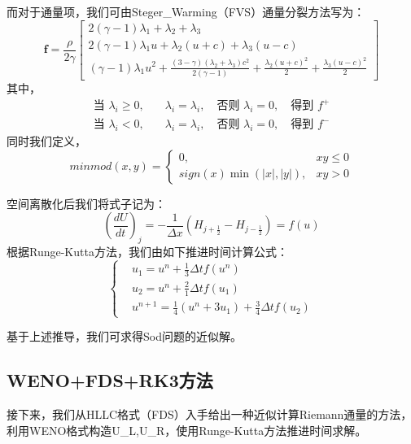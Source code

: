 \documentclass[12pt,a4paper]{article}%
\begin{document}
		而对于通量项，我们可由Steger\_Warming（FVS）通量分裂方法写为：
		\[
		\mathbf{f} = \frac{\rho}{2\gamma}
		\begin{bmatrix}
			2(\gamma - 1)\lambda_1 + \lambda_2 + \lambda_3 \\
			2(\gamma - 1)\lambda_1 u + \lambda_2 (u + c) + \lambda_3 (u - c) \\
			(\gamma - 1)\lambda_1 u^2 + \frac{(3 - \gamma)(\lambda_2 + \lambda_3)c^2}{2(\gamma - 1)} + \frac{\lambda_2 (u + c)^2}{2} + \frac{\lambda_3 (u - c)^2}{2}
		\end{bmatrix}
		\]
		其中，
		\[
		\begin{aligned}
			\text{当 } \lambda_i \geq 0,\quad & \lambda_i = \lambda_i,\quad \text{否则 } \lambda_i = 0,\quad \text{得到 } f^+ \\
			\text{当 } \lambda_i < 0,\quad & \lambda_i = \lambda_i,\quad \text{否则 } \lambda_i = 0,\quad \text{得到 } f^-
		\end{aligned}
		\]
		同时我们定义，
		\[
			minmod(x,y) = 
			\begin{cases}
				0, & xy \leq 0 \\
				sign(x)\min(|x|,|y|), & xy>0
			\end{cases}
		\]
		
		空间离散化后我们将式子记为：
		\[
			(\frac{dU}{dt})_j = -\frac{1}{\Delta x}(H_{j+\frac12} - H_{j-\frac12}) = f(u)
		\]
		根据Runge-Kutta方法，我们由如下推进时间计算公式：
		\[
		\left\{
			\begin{aligned}
				& u_1 = u^n + \frac13 \Delta t f(u^n) \\
				& u_2 = u^n + \frac21 \Delta t f(u_1) \\
				& u^{n+1} = \frac14 (u^n+3u_1) + \frac34 \Delta t f(u_2)
			\end{aligned}
		\right.
		\]
		
		基于上述推导，我们可求得Sod问题的近似解。
		
		\subsection{WENO+FDS+RK3方法}
		接下来，我们从HLLC格式（FDS）入手给出一种近似计算Riemann通量的方法，利用WENO格式构造U\_L,U\_R，使用Runge-Kutta方法推进时间求解。
		
\end{document}
